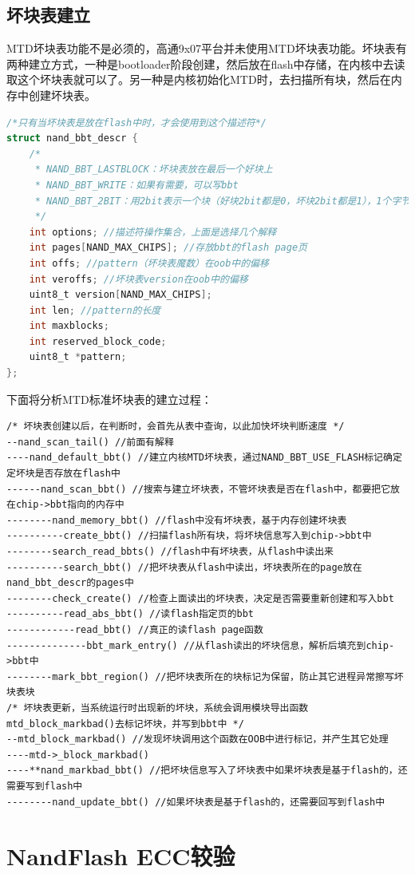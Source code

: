\subsection{坏块表建立}
MTD坏块表功能不是必须的，高通9x07平台并未使用MTD坏块表功能。坏块表有两种建立方式，一种是bootloader阶段创建，然后放在flash中存储，在内核中去读取这个坏块表就可以了。另一种是内核初始化MTD时，去扫描所有块，然后在内存中创建坏块表。
\begin{lstlisting}[language=C]
/*只有当坏块表是放在flash中时，才会使用到这个描述符*/
struct nand_bbt_descr {
	/*
	 * NAND_BBT_LASTBLOCK：坏块表放在最后一个好块上
	 * NAND_BBT_WRITE：如果有需要，可以写bbt
	 * NAND_BBT_2BIT：用2bit表示一个块（好块2bit都是0，坏块2bit都是1），1个字节就能描述4个块
	 */
	int options; //描述符操作集合，上面是选择几个解释
	int pages[NAND_MAX_CHIPS]; //存放bbt的flash page页
	int offs; //pattern（坏块表魔数）在oob中的偏移
	int veroffs; //坏块表version在oob中的偏移
	uint8_t version[NAND_MAX_CHIPS];
	int len; //pattern的长度
	int maxblocks;
	int reserved_block_code;
	uint8_t *pattern;
};
\end{lstlisting}
下面将分析MTD标准坏块表的建立过程：
\begin{mdframed}[style=leftredline]
\begin{verbatim}
/* 坏块表创建以后，在判断时，会首先从表中查询，以此加快坏块判断速度 */
--nand_scan_tail() //前面有解释
----nand_default_bbt() //建立内核MTD坏块表，通过NAND_BBT_USE_FLASH标记确定定坏块是否存放在flash中
------nand_scan_bbt() //搜索与建立坏块表，不管坏块表是否在flash中，都要把它放在chip->bbt指向的内存中
--------nand_memory_bbt() //flash中没有坏块表，基于内存创建坏块表
----------create_bbt() //扫描flash所有块，将坏块信息写入到chip->bbt中
--------search_read_bbts() //flash中有坏块表，从flash中读出来
----------search_bbt() //把坏块表从flash中读出，坏块表所在的page放在nand_bbt_descr的pages中
--------check_create() //检查上面读出的坏块表，决定是否需要重新创建和写入bbt
----------read_abs_bbt() //读flash指定页的bbt
------------read_bbt() //真正的读flash page函数
--------------bbt_mark_entry() //从flash读出的坏块信息，解析后填充到chip->bbt中
--------mark_bbt_region() //把坏块表所在的块标记为保留，防止其它进程异常擦写坏块表块
/* 坏块表更新，当系统运行时出现新的坏块，系统会调用模块导出函数mtd_block_markbad()去标记坏块，并写到bbt中 */
--mtd_block_markbad() //发现坏块调用这个函数在OOB中进行标记，并产生其它处理
----mtd->_block_markbad()
----**nand_markbad_bbt() //把坏块信息写入了坏块表中如果坏块表是基于flash的，还需要写到flash中
--------nand_update_bbt() //如果坏块表是基于flash的，还需要回写到flash中
\end{verbatim}
\end{mdframed}

\clearpage
\section{NandFlash ECC较验}















